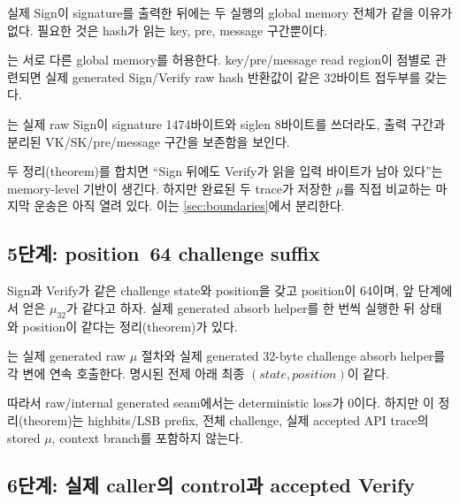 실제 Sign이 signature를 출력한 뒤에는 두 실행의 global memory 전체가 같을
이유가 없다. 필요한 것은 hash가 읽는 key, pre, message 구간뿐이다.

\begin{verified}
는 서로 다른 global
memory를 허용한다. key/pre/message read region이 점별로 관련되면 실제
generated Sign/Verify raw hash 반환값이 같은 32바이트 접두부를 갖는다.
\end{verified}

\begin{verified}
는 실제 raw Sign이 signature
1474바이트와 siglen 8바이트를 쓰더라도, 출력 구간과 분리된 VK/SK/pre/message
구간을 보존함을 보인다.
\end{verified}

두 정리(theorem)를 합치면 ``Sign 뒤에도 Verify가 읽을 입력 바이트가 남아 있다''는
memory-level 기반이 생긴다. 하지만 완료된 두 trace가 저장한 \(\mu\)를 직접
비교하는 마지막 운송은 아직 열려 있다. 이는 \cref{sec:boundaries}에서
분리한다.

\subsection{5단계: position~64 challenge suffix}

Sign과 Verify가 같은 challenge state와 position을 갖고 position이 64이며,
앞 단계에서 얻은 \(\mu_{32}\)가 같다고 하자. 실제 generated absorb helper를
한 번씩 실행한 뒤 상태와 position이 같다는 정리(theorem)가 있다.

\begin{verified}
는 실제 generated
raw \(\mu\) 절차와 실제 generated 32-byte challenge absorb helper를 각 변에
연속 호출한다. 명시된 전제 아래 최종 \((\mathit{state},\mathit{position})\)이
같다.
\end{verified}

따라서 raw/internal generated seam에서는 deterministic loss가 0이다. 하지만
이 정리(theorem)는 highbits/LSB prefix, 전체 challenge, 실제 accepted API trace의 stored
\(\mu\), context branch를 포함하지 않는다.

\subsection{6단계: 실제 caller의 control과 accepted Verify}

